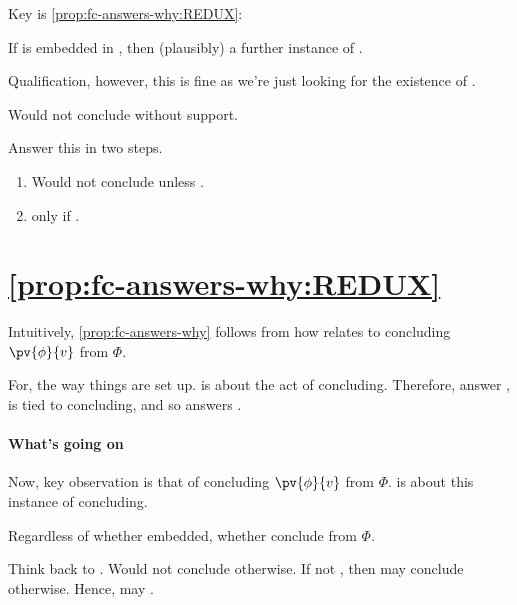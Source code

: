 \begin{note}
  Key is \autoref{prop:fc-answers-why:REDUX}:
  \begin{proposition}
    \label{prop:fc-answers-why:REDUX}
    If \fc{} is embedded in \support{}, then (plausibly) a further instance of \qzS{}.
  \end{proposition}
  Qualification, however, this is fine as we're just looking for the existence of .
\end{note}

\begin{note}
  Would not conclude without support.

  Answer this in two steps.
  \begin{enumerate}
  \item
    Would not conclude unless \fc{}.
  \item
    \fc{} only if \support{}.
  \end{enumerate}
\end{note}

\section{\autoref{prop:fc-answers-why:REDUX}}
\label{sec:simple-argument}

\begin{note}
  Intuitively, \autoref{prop:fc-answers-why} follows from how \qzS{} relates to concluding \(\pv{\phi}{v}\) from \(\Phi\).

  For, the way things are set up.
  \qzS{} is about the act of concluding.
  Therefore, answer \qzS{}, is tied to concluding, and so \support{} answers \qWhyV{}.
\end{note}

\paragraph{What's going on}

\begin{note}
  Now, key observation is that \requ{} of concluding \(\pv{\phi}{v}\) from \(\Phi\).
  \qzS{} is about this instance of concluding.

  Regardless of whether embedded, whether conclude from \(\Phi\).

  Think back to \requ{}.
  Would not conclude otherwise.
  If not \fc{}, then may conclude otherwise.
  Hence, may \deadEnd{} \support{}.
\end{note}

